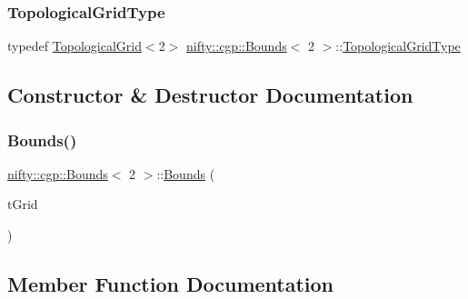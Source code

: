 \subsubsection{\texorpdfstring{Topological\+Grid\+Type}{TopologicalGridType}}
{\footnotesize\ttfamily typedef \hyperlink{classnifty_1_1cgp_1_1TopologicalGrid}{Topological\+Grid}$<$2$>$ \hyperlink{classnifty_1_1cgp_1_1Bounds}{nifty\+::cgp\+::\+Bounds}$<$ 2 $>$\+::\hyperlink{classnifty_1_1cgp_1_1Bounds_3_012_01_4_a97f375ade92ba9870b7a31da87626337}{Topological\+Grid\+Type}}



\subsection{Constructor \& Destructor Documentation}
\mbox{\label{classnifty_1_1cgp_1_1Bounds_3_012_01_4_aadcad33a9b3fa58464bae7aae61f3f5d}} 
\subsubsection{\texorpdfstring{Bounds()}{Bounds()}}
{\footnotesize\ttfamily \hyperlink{classnifty_1_1cgp_1_1Bounds}{nifty\+::cgp\+::\+Bounds}$<$ 2 $>$\+::\hyperlink{classnifty_1_1cgp_1_1Bounds}{Bounds} (\begin{DoxyParamCaption}\item[{const \hyperlink{classnifty_1_1cgp_1_1Bounds_3_012_01_4_a97f375ade92ba9870b7a31da87626337}{Topological\+Grid\+Type} \&}]{t\+Grid }\end{DoxyParamCaption})\hspace{0.3cm}{\ttfamily [inline]}}



\subsection{Member Function Documentation}
\mbox{\label{classnifty_1_1cgp_1_1Bounds_3_012_01_4_a169f3c4bb30362d91ac8536d9d4800c4}} 
